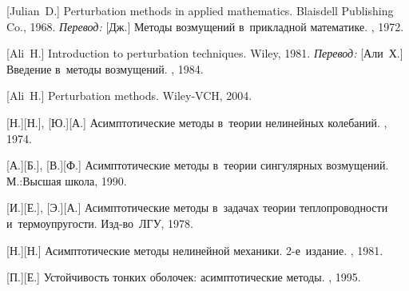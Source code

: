 \begin{thebibliography}{123}
\begin{otherlanguage}{russian}

[Julian~D.] Perturbation methods in applied mathematics. Blaisdell Publishing Co., 1968. 
\emph{Перевод:} [Дж.] Методы возмущений в~прикладной математике. \mirpublisher, 1972. 

[Ali~H.] Introduction to perturbation techniques. Wiley, 1981. 
\emph{Перевод:} [Али~Х.] Введение в~методы возмущений. \mirpublisher, 1984. 

[Ali~H.] Perturbation methods. Wiley-VCH, 2004. 

[Н.][Н.], [Ю.][А.] Асимптотические методы в~теории нелинейных колебаний. \naukapublisher, 1974. 

[А.][Б.], [В.][Ф.] Асимптотические методы в~теории сингулярных возмущений. М.:\;Высшая школа, 1990. 

[И.][Е.], %
[Э.][А.] %
Асимптотические методы в~задачах теории теплопроводности и~термоупругости. Изд\hbox{-}во~ЛГУ, 1978. 

[Н.][Н.] Асимптотические методы нелинейной механики. 2\hbox{-}е~издание. \naukapublisher, 1981. 

[П.][Е.] Устойчивость тонких оболочек: асимптотические методы. \naukapublisher, 1995. 

%
%



\end{otherlanguage}
\end{thebibliography}
